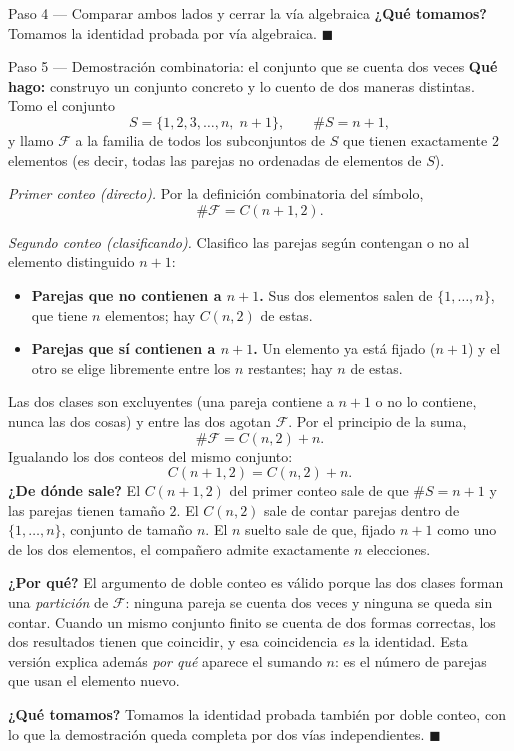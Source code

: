 \documentclass[11pt]{article}
\begin{document}
\begin{sol}
\begin{paso}{Paso 4 --- Comparar ambos lados y cerrar la vía algebraica}
\textbf{¿Qué tomamos?} Tomamos la identidad probada por vía algebraica. $\blacksquare$
\end{paso}

\begin{paso}{Paso 5 --- Demostración combinatoria: el conjunto que se cuenta dos veces}
\textbf{Qué hago:} construyo un conjunto concreto y lo cuento de dos maneras distintas. Tomo
el conjunto
\[
S=\{1,2,3,\dots,n,\;n+1\},\qquad \#S=n+1,
\]
y llamo $\mathcal{F}$ a la familia de todos los subconjuntos de $S$ que tienen exactamente
$2$ elementos (es decir, todas las parejas no ordenadas de elementos de $S$).

\emph{Primer conteo (directo).} Por la definición combinatoria del símbolo,
\[
\#\mathcal{F}=C(n+1,2).
\]

\emph{Segundo conteo (clasificando).} Clasifico las parejas según contengan o no al elemento
distinguido $n+1$:
\begin{itemize}[leftmargin=*]
  \item \textbf{Parejas que no contienen a $n+1$.} Sus dos elementos salen de
        $\{1,\dots,n\}$, que tiene $n$ elementos; hay $C(n,2)$ de estas.
  \item \textbf{Parejas que sí contienen a $n+1$.} Un elemento ya está fijado ($n+1$) y el
        otro se elige libremente entre los $n$ restantes; hay $n$ de estas.
\end{itemize}
Las dos clases son excluyentes (una pareja contiene a $n+1$ o no lo contiene, nunca las dos
cosas) y entre las dos agotan $\mathcal{F}$. Por el principio de la suma,
\[
\#\mathcal{F}=C(n,2)+n .
\]
Igualando los dos conteos del mismo conjunto:
\[
C(n+1,2)=C(n,2)+n .
\]
\textbf{¿De dónde sale?} El $C(n+1,2)$ del primer conteo sale de que $\#S=n+1$ y las parejas
tienen tamaño $2$. El $C(n,2)$ sale de contar parejas dentro de $\{1,\dots,n\}$, conjunto de
tamaño $n$. El $n$ suelto sale de que, fijado $n+1$ como uno de los dos elementos, el
compañero admite exactamente $n$ elecciones.

\textbf{¿Por qué?} El argumento de doble conteo es válido porque las dos clases forman una
\emph{partición} de $\mathcal{F}$: ninguna pareja se cuenta dos veces y ninguna se queda sin
contar. Cuando un mismo conjunto finito se cuenta de dos formas correctas, los dos resultados
tienen que coincidir, y esa coincidencia \emph{es} la identidad. Esta versión explica además
\emph{por qué} aparece el sumando $n$: es el número de parejas que usan el elemento nuevo.

\textbf{¿Qué tomamos?} Tomamos la identidad probada también por doble conteo, con lo que la
demostración queda completa por dos vías independientes. $\blacksquare$
\end{paso}
\end{sol}
\end{document}
